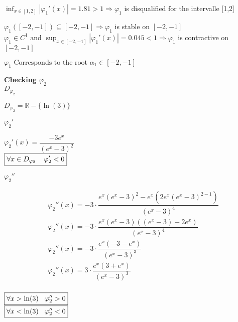 \(\displaystyle\inf_{x \in [1, 2]} |\varphi_1'(x)| = 1.81 > 1 \Longrightarrow \varphi_1\) is disqualified 
for the intervalle [1,2]

\vspace{0.5cm}
\(\varphi_1([-2,-1]) \subseteq [-2,-1] \Longrightarrow \varphi_1\) is stable on \([-2,-1]\)\\[0.1cm]
\( \varphi_1 \in C^{1} \text{ and } \displaystyle\sup_{x \in [-2, -1]} |\varphi_1'(x)| = 0.045 < 1 \Longrightarrow \varphi_1\) is contractive on \([-2,-1]\)

\begin{center}
    \(\boxed{\varphi_1 \text{ Corresponds to the root } \alpha_1 \in [-2,-1]}\)
\end{center}

\vspace{1cm}
\textbf{\underline{Checking \(\varphi_2\)}}\\[0.15cm]
\textbf{\underline{\(D_{\varphi_2}\)}}
\begin{center}
    \( \boxed{D_{\varphi_2} = \mathbb{R} - \{\ln{(3)}\}}\)
\end{center}

\textbf{\underline{\(\varphi_2'\)}}
\begin{center}
    \(\boxed{\varphi_2'(x) = \dfrac{-3e^{x}}{(e^{x}-3)^{2}}}\)\\[0.45cm]
    \(\boxed{\forall x \in D_{\varphi_2} \hspace{0.4cm} \varphi_2' < 0}\)
    \end{center}

\newpage
\textbf{\underline{\(\varphi_2''\)}}
\begin{center}
    \begin{align*}
        &\varphi_2''(x) = -3 \cdot \dfrac{e^{x}(e^x - 3)^2 - e^{x}(2e^x(e^x-3)^{2-1})}{(e^{x}-3)^4}\\[0.15cm]
        &\varphi_2''(x) = -3 \cdot \dfrac{e^{x}(e^x - 3) ((e^x - 3) - 2e^{x})}{(e^{x}-3)^4}\\[0.15cm]
        &\varphi_2''(x) = -3 \cdot \dfrac{e^{x} (- 3 -e^{x})}{(e^{x}-3)^3}\\[0.15cm]
        &\boxed{\varphi_2''(x) = 3 \cdot \dfrac{e^{x} (3 + e^{x})}{(e^{x}-3)^3}}\\[0.15cm]
    \end{align*}
\end{center}

\begin{center}
    \(\boxed{\forall x > \ln(3) \hspace{0.3cm} \varphi_2'' > 0}\)\\[0.15cm]
    \(\boxed{\forall x < \ln(3) \hspace{0.3cm} \varphi_2'' < 0}\)
\end{center}

